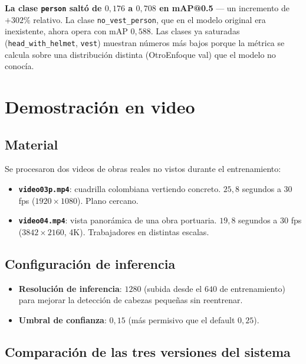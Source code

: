 \documentclass[journal,onecolumn,11pt]{IEEEtran}
\begin{document}
\begin{hallazgo}
\textbf{La clase \texttt{person} saltó de $0{,}176$ a $0{,}708$ en
mAP@0.5} — un incremento de $+302\%$ relativo. La clase
\texttt{no\_vest\_person}, que en el modelo original era
inexistente, ahora opera con mAP $0{,}588$. Las clases ya saturadas
(\texttt{head\_with\_helmet}, \texttt{vest}) muestran números más
bajos porque la métrica se calcula sobre una distribución distinta
(OtroEnfoque val) que el modelo no conocía.
\end{hallazgo}

\section{Demostración en video}

\subsection{Material}

Se procesaron dos videos de obras reales no vistos durante el
entrenamiento:
\begin{itemize}[leftmargin=*]
    \item \textbf{\texttt{video03p.mp4}}: cuadrilla colombiana
    vertiendo concreto. $25{,}8$ segundos a $30$ fps
    ($1920\times1080$). Plano cercano.
    \item \textbf{\texttt{video04.mp4}}: vista panorámica de una obra
    portuaria. $19{,}8$ segundos a $30$ fps ($3842\times2160$, 4K).
    Trabajadores en distintas escalas.
\end{itemize}

\subsection{Configuración de inferencia}

\begin{itemize}[leftmargin=*]
    \item \textbf{Resolución de inferencia}: $1280$ (subida desde el
    $640$ de entrenamiento) para mejorar la detección de cabezas
    pequeñas sin reentrenar.
    \item \textbf{Umbral de confianza}: $0{,}15$ (más permisivo que
    el default $0{,}25$).
\end{itemize}

\subsection{Comparación de las tres versiones del sistema}
\end{document}
